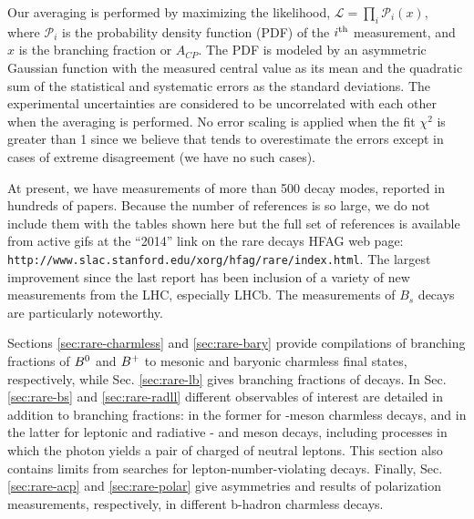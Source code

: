 Our averaging is performed by maximizing the likelihood,
   $\displaystyle {\mathcal L} = \prod_i {\mathcal P}_i(x),$  
where ${\mathcal P_i}$ is the probability density function (PDF) of the
$i^{\rm th}$  measurement, and $x$ is the branching fraction or $A_{CP}$.
The PDF is modeled by an asymmetric Gaussian function with the measured
central value as its mean and the quadratic sum of the statistical
and systematic errors as the standard deviations. The experimental
uncertainties are considered to be uncorrelated with each other when the 
averaging is performed. No error scaling is applied when the fit $\chi^2$ is 
greater than 1 since we believe that tends to overestimate the errors
except in cases of extreme disagreement (we have no such cases).

At present, we have measurements of more than 500 decay modes, reported in
hundreds of 
papers. Because the number of references is so large, we do
not include them with the tables shown here but the full set of
references is available from active gifs at the 
``2014'' link on 
the rare decays HFAG web page: {\tt http://www.slac.stanford.edu/xorg/hfag/rare/index.html}.
The largest improvement since the last report has been inclusion of a
variety of new measurements from the LHC, especially LHCb.  The
measurements of $B_s$ decays are particularly noteworthy.

Sections \ref{sec:rare-charmless} and \ref{sec:rare-bary} provide compilations of branching fractions of‏ $B^0$ and $B^{+}$ to mesonic and baryonic charmless final states, respectively, 
while Sec. \ref{sec:rare-lb} gives branching fractions of \Lb decays.
In Sec. \ref{sec:rare-bs} and \ref{sec:rare-radll} different observables of interest are detailed in addition to branching fractions: in the former for \Bs-meson charmless decays, and in the latter for leptonic and radiative \Bz- and \Bp meson decays, including processes in which the photon yields a pair of charged of neutral leptons. This section also contains limits from searches for lepton-number-violating decays.
Finally, Sec. \ref{sec:rare-acp} and \ref{sec:rare-polar} give \CP asymmetries and results of polarization measurements, respectively, in different b-hadron charmless decays.


